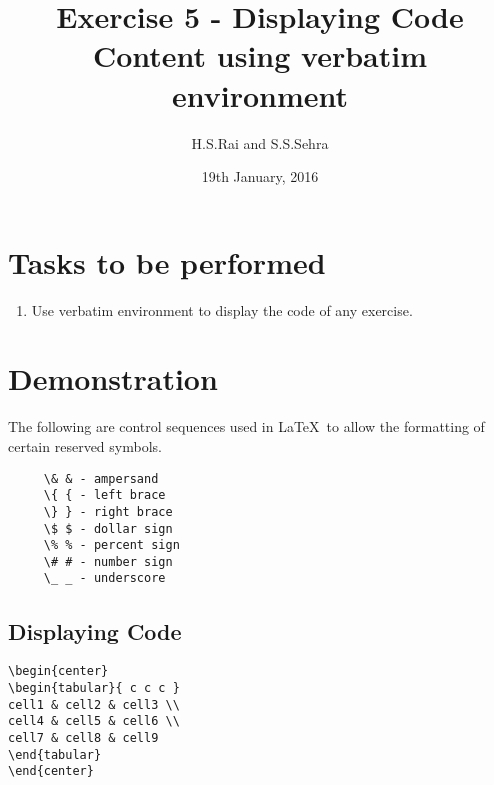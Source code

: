 \title{Exercise 5 - Displaying Code Content using verbatim environment}
\author{H.S.Rai and S.S.Sehra}
\date{19th January, 2016}

	\maketitle	
	\section*{Tasks to be performed}
	\begin{enumerate}	
		\item Use verbatim environment to display the code of any exercise.
	\end{enumerate}
	\section*{Demonstration}
       
      The following are control sequences used 
     in \LaTeX\ to allow the formatting of certain 
     reserved symbols. 

     \begin{verbatim}
     \& & - ampersand 
     \{ { - left brace 
     \} } - right brace 
     \$ $ - dollar sign 
     \% % - percent sign 
     \# # - number sign 
     \_ _ - underscore 
     \end{verbatim}
\subsection*{Displaying Code}
\begin{verbatim}
\begin{center}
\begin{tabular}{ c c c }
cell1 & cell2 & cell3 \\ 
cell4 & cell5 & cell6 \\  
cell7 & cell8 & cell9    
\end{tabular}
\end{center}
\end{verbatim}
     
     